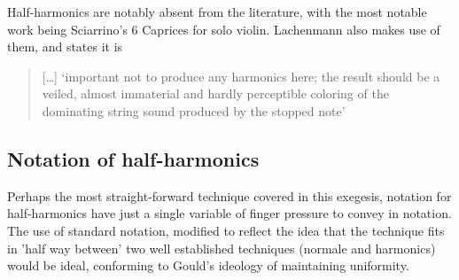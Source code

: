 Half-harmonics are notably absent from the literature, with the most notable work being Sciarrino's 6 Caprices for solo violin.\autocite{sciarrinoCapricciViolino1976} 
Lachenmann also makes use of them, and states it is
\begin{quotation}
  [\dots] `important not to produce any harmonics here; the result should be a veiled, almost immaterial and hardly perceptible coloring of the dominating string sound produced by the stopped note'\autocite[foreword]{lachenmannMusikFurStreichquartett1972}
\end{quotation}

\subsection{Notation of half-harmonics}
Perhaps the most straight-forward technique covered in this exegesis, notation for half-harmonics have just a single variable of finger pressure to convey in notation.
The use of standard notation, modified to reflect the idea that the technique fits in 'half way between' two well established techniques (normale and harmonics) would be ideal, conforming to Gould's ideology of maintaining uniformity.
